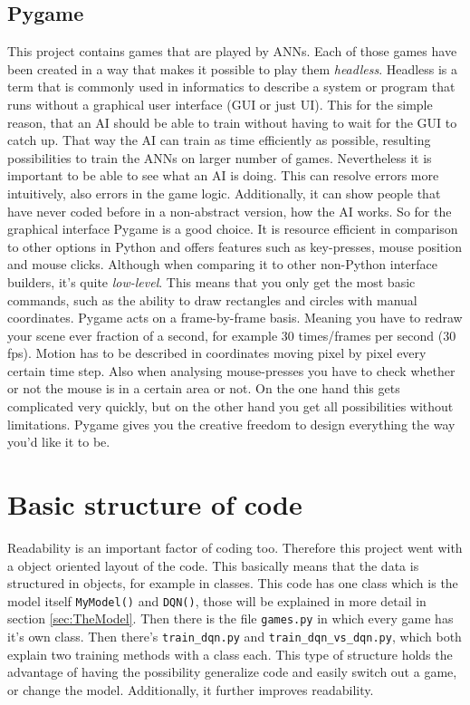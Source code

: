 \documentclass[12pt]{article}
\begin{document}
\subsection{Pygame}
This project contains games that are played by ANNs. Each of those games have been created in a way that makes it possible to play them \textit{headless}. Headless is a term that is commonly used in informatics to describe a system or program that runs without a graphical user interface (GUI or just UI). This for the simple reason, that an AI should be able to train without having to wait for the GUI to catch up. That way the AI can train as time efficiently as possible, resulting possibilities to train the ANNs on larger number of games. Nevertheless it is important to be able to see what an AI is doing. This can resolve errors more intuitively, also errors in the game logic. Additionally, it can show people that have never coded before in a non-abstract version, how the AI works. So for the graphical interface Pygame is a good choice. It is resource efficient in comparison to other options in Python and offers features such as key-presses, mouse position and mouse clicks. Although when comparing it to other non-Python interface builders, it's quite \textit{low-level}. This means that you only get the most basic commands, such as the ability to draw rectangles and circles with manual coordinates. Pygame acts on a frame-by-frame basis. Meaning you have to redraw your scene ever fraction of a second, for example 30 times/frames per second (30 fps). Motion has to be described in coordinates moving pixel by pixel every certain time step. Also when analysing mouse-presses you have to check whether or not the mouse is in a certain area or not. On the one hand this gets complicated very quickly, but on the other hand you get all possibilities without limitations. Pygame gives you the creative freedom to design everything the way you'd like it to be. \cite{PyGame}
\section{Basic structure of code}
Readability is an important factor of coding too. Therefore this project went with a object oriented layout of the code. This basically means that the data is structured in objects, for example in classes. This code has one class which is the model itself \lstinline{MyModel()} and \lstinline{DQN()}, those will be explained in more detail in section \ref{sec:TheModel}. Then there is the file \lstinline{games.py} in which every game has it's own class. Then there's \lstinline{train_dqn.py} and \lstinline{train_dqn_vs_dqn.py}, which both explain two training methods with a class each. This type of structure holds the advantage of having the possibility generalize code and easily switch out a game, or change the model. Additionally, it further improves readability.
\end{document}
